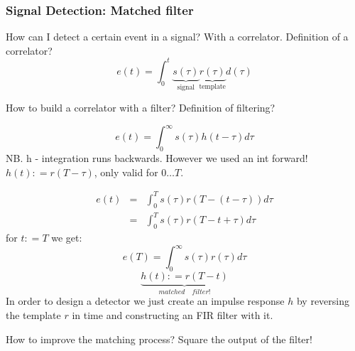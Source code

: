 \documentclass[12pt,a4paper]{article}
\begin{document}
\subsubsection{Signal Detection: Matched filter}
How can I detect a certain event in a signal? With a correlator.
Definition of a correlator?
\begin{equation}
e(t) = \int_{0}^{t} \underbrace{s(\tau)}_{\mbox{signal}} \underbrace{r(\tau)}_{\mbox{template}} d(\tau)
\end{equation}

How to build a correlator with a filter? Definition of filtering?

\begin{equation}
e(t) = \int_{0}^{\infty} s(\tau) h(t - \tau) d\tau 
\end{equation}
NB. h - integration runs backwards.  However we used an int forward!
$h(t) : = r(T - \tau)$, only valid for $0\ldots T$.

\begin{eqnarray} 
e(t) & = & \int_{0}^{T} s(\tau) r \left(T - (t - \tau)\right) d\tau \\
     & = & \int_{0}^{T} s(\tau) r(T - t + \tau) d\tau 
\end{eqnarray}
for $t: = T$ we get:
\begin{equation}
e(T) = \int_{0}^{\infty} s(\tau) r (\tau) d\tau
\end{equation}
\begin{equation}
\underbrace{h(t) : = r(T - t)}_{ matched \quad  filter!} 
\end{equation}
In order to design a detector we just create an impulse
response $h$ by reversing the template $r$ in time and
constructing an FIR filter with it.

How to improve the matching process? Square the output of the filter!
\end{document}
